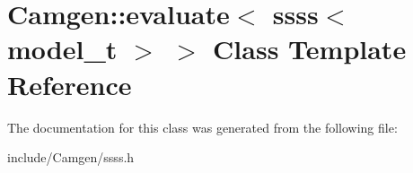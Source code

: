 \hypertarget{a00196}{\section{Camgen\-:\-:evaluate$<$ ssss$<$ model\-\_\-t $>$ $>$ Class Template Reference}
\label{a00196}
}


The documentation for this class was generated from the following file\-:\begin{DoxyCompactItemize}
\item 
include/\-Camgen/ssss.\-h\end{DoxyCompactItemize}
